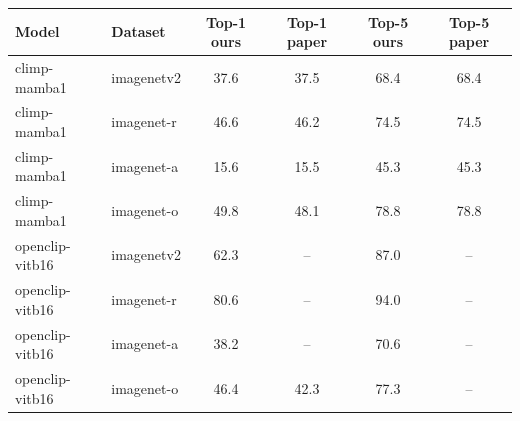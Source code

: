 \begin{tabular}{llcccc}
\toprule
Model & Dataset & Top-1 ours & Top-1 paper & Top-5 ours & Top-5 paper \\
\midrule
climp-mamba1 & imagenetv2 & 37.6 & 37.5 & 68.4 & 68.4 \\
climp-mamba1 & imagenet-r & 46.6 & 46.2 & 74.5 & 74.5 \\
climp-mamba1 & imagenet-a & 15.6 & 15.5 & 45.3 & 45.3 \\
climp-mamba1 & imagenet-o & 49.8 & 48.1 & 78.8 & 78.8 \\
openclip-vitb16 & imagenetv2 & 62.3 & – & 87.0 & – \\
openclip-vitb16 & imagenet-r & 80.6 & – & 94.0 & – \\
openclip-vitb16 & imagenet-a & 38.2 & – & 70.6 & – \\
openclip-vitb16 & imagenet-o & 46.4 & 42.3 & 77.3 & – \\
\bottomrule
\end{tabular}

